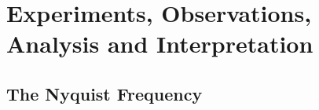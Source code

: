 \documentclass[11pt]{article}
\begin{document}
\section{Experiments, Observations, Analysis and Interpretation} 



\subsection{The Nyquist Frequency}
\end{document}
